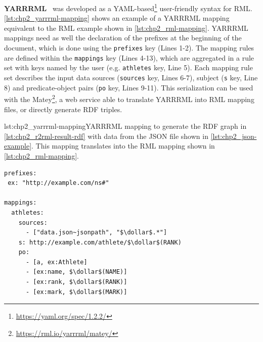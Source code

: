 \textbf{YARRRML}~\parencite{Heyvaert2018yarrrml} was developed as a YAML-based\footnote{\url{https://yaml.org/spec/1.2.2/}} user-friendly syntax for RML. 
\cref{lst:chp2_yarrrml-mapping} shows an example of a YARRRML mapping equivalent to the RML example shown in \cref{lst:chp2_rml-mapping}. 
YARRRML mappings need as well the declaration of the prefixes at the beginning of the document, which is done using the \texttt{prefixes} key (Lines 1-2). The mapping rules are defined within the \texttt{mappings} key (Lines 4-13), which are aggregated in a rule set with keys named by the user (e.g. \texttt{athletes} key, Line 5). Each mapping rule set describes the input data sources (\texttt{sources} key, Lines 6-7), subject (\texttt{s} key, Line 8) and predicate-object pairs (\texttt{po} key, Lines 9-11).
This serialization can be used with the Matey\footnote{\url{https://rml.io/yarrrml/matey/}}, a web service able to translate YARRRML into RML mapping files, or directly generate RDF triples. 

\begin{captionedlisting}{lst:chp2_yarrrml-mapping}{YARRRML mapping to generate the RDF graph in \cref{lst:chp2_r2rml-result-rdf} with data from the JSON file shown in \cref{lst:chp2_json-example}. This mapping translates into the RML mapping shown in \cref{lst:chp2_rml-mapping}.}
\centering
{\begin{lstlisting}[language=yarrrml]
prefixes:
 ex: "http://example.com/ns#"

mappings:
  athletes:
    sources:
      - ["data.json~jsonpath", "$\dollar$.*"]
    s: http://example.com/athlete/$\dollar$(RANK)
    po:
      - [a, ex:Athlete]
      - [ex:name, $\dollar$(NAME)]
      - [ex:rank, $\dollar$(RANK)]
      - [ex:mark, $\dollar$(MARK)]
\end{lstlisting}}
\end{captionedlisting}
